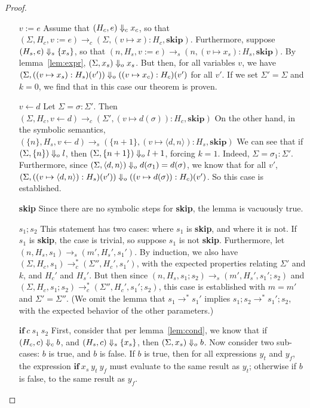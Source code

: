 \begin{proof}
  \begin{itemize}
  \item[$v := e$] Assume that $(H_c, e) \Downarrow_c x_c$, so that
    $(\Sigma, H_c, v := e) \to_c (\Sigma, (v \mapsto x):H_c, \mathbf{skip})$.
    Furthermore, suppose $(H_s, e) \Downarrow_s \{ x_s \}$, so that
    $(n, H_s, v := e) \to_s (n, (v \mapsto x_s):H_s, \mathbf{skip})$.
    By lemma~\ref{lem:expr}, $(\Sigma, x_s) \Downarrow_o x_s$.  But then,
    for all variables $v$, we have
    $(\Sigma, ((v \mapsto x_s):H_s)(v')) \Downarrow_o ((v \mapsto x_c):H_c)(v')$
    for all $v'$.  If we set $\Sigma' = \Sigma$ and $k = 0$, we find
    that in this case our theorem is proven.
  \item[$v \leftarrow d$] Let $\Sigma = \sigma:\Sigma'$.  Then
    $(\Sigma, H_c, v \leftarrow d) \to_c (\Sigma', (v \mapsto d(\sigma)):H_c, \mathbf{skip})$
    On the other hand, in the symbolic semantics,
    $(\{ n \}, H_s, v \leftarrow d) \to_s (\{ n+1 \}, (v \mapsto \langle d, n \rangle):H_s, \mathbf{skip})$
    We can see that
    if $(\Sigma, \{ n \}) \Downarrow_o l$, then $(\Sigma, \{n + 1\}) \Downarrow_o l + 1$,
    forcing $k = 1$. Indeed, $\Sigma = \sigma_1:\Sigma'$.  Furthermore, since
    $(\Sigma, \langle d, n \rangle) \Downarrow_o d(\sigma_1) = d(\sigma)$,
    we know that for all $v'$,
    $(\Sigma, ((v \mapsto \langle d, n \rangle):H_s)(v')) \Downarrow_o ((v \mapsto d(\sigma)):H_c)(v')$.
    So this case is established.
  \item[\textbf{skip}] Since there are no symbolic steps
    for \textbf{skip}, the lemma is vacuously true.
  \item[$s_1 ; s_2$] This statement has two cases: where $s_1$ is
    \textbf{skip}, and where it is not.  If $s_1$ is \textbf{skip},
    the case is trivial, so suppose $s_1$ is not \textbf{skip}.
    Furthermore, let $(n, H_s, s_1) \to_s (m', H_s', s_1')$.
    By induction, we also have
    $(\Sigma, H_c, s_1) \to_c^* (\Sigma'', H_c', s_1')$,
    with the expected properties relating $\Sigma'$ and $k$, and
    $H_c'$ and $H_s'$.  But then since
    $(n, H_s, s_1 ; s_2) \to_s (m', H_s', s_1' ; s_2)$
    and
    $(\Sigma, H_c, s_1 ; s_2) \to_c^* (\Sigma'', H_c', s_1' ; s_2)$,
    this case is established with $m = m'$ and $\Sigma' = \Sigma''$.
    (We omit the lemma that
    $s_1 \to^* s_1'$ implies $s_1 ; s_2 \to^* s_1' ; s_2$,
    with the expected behavior of the other parameters.)
  \item[$\mathbf{if}\:c\:s_1\:s_2$]
    First, consider that per lemma~\ref{lem:cond},
      we know that if $(H_c, c) \Downarrow_c b$,
      and $(H_s, c) \Downarrow_s \{ x_s \}$,
      then $(\Sigma, x_s) \Downarrow_o b$.
    Now consider two sub-cases:
      $b$ is true, and $b$ is false.
    If $b$ is true,
      then for all expressions $y_t$ and $y_f$,
      the expression $\mathbf{if}\:x_s\:y_t\:y_f$
      must evaluate to the same result as $y_t$;
      otherwise if $b$ is false,
      to the same result as $y_f$.


\end{itemize}
\end{proof}
